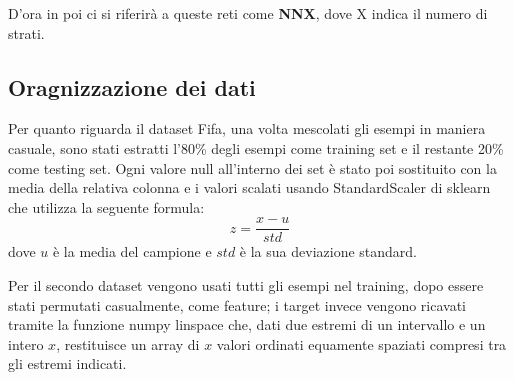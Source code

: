 \documentclass[12pt]{report}
\begin{document}
D'ora in poi ci si riferirà a queste reti come \textbf{NNX}, dove X indica il numero di strati.

\subsection{Oragnizzazione dei dati}
Per quanto riguarda il dataset Fifa, una volta mescolati gli esempi in maniera casuale, sono stati estratti l'80\% degli esempi come training set e il restante 20\% come testing set. Ogni valore null all’interno dei set è stato poi sostituito con la media della relativa colonna e i valori scalati usando StandardScaler di sklearn che utilizza la seguente formula:
\begin{equation}
z = \frac{x - u}{std}
\label{standardscaler}
\end{equation}
dove $u$ è la media del campione e $std$ è la sua deviazione standard.

Per il secondo dataset vengono usati tutti gli esempi nel training, dopo essere stati permutati casualmente, come feature; i target invece vengono ricavati tramite la funzione numpy linspace che, dati due estremi di un intervallo e un intero $x$, restituisce un array di $x$ valori ordinati equamente spaziati compresi tra gli estremi indicati.
\end{document}
